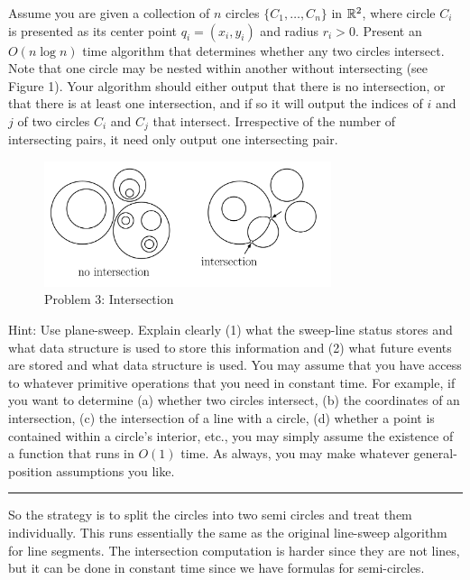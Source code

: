 \documentclass[11pt]{article}
\begin{document}

Assume you are given a collection of $n$ circles $\{C_1 , \ldots , C_n \}$ in
$\mathbb{R}^2$, where circle $C_i$ is presented as its center point $q_i = (x_i, y_i)$
and radius $r_i > 0$. Present an $O(n \log n)$ time algorithm that determines
whether any two circles intersect. Note that one circle may be nested within
another without intersecting (see Figure 1). Your algorithm should either output
that there is no intersection, or that there is at least one intersection, and
if so it will output the indices of $i$ and $j$ of two circles $C_i$ and $C_j$
that intersect. Irrespective of the number of intersecting pairs, it need only
output one intersecting pair.

\begin{figure}[h]
    \centering
    \includegraphics[width=0.75\textwidth]{intersection}
    \caption{Problem 3: Intersection}
\end{figure}

Hint: Use plane-sweep. Explain clearly (1) what the sweep-line status stores and
what data structure is used to store this information and (2) what future events
are stored and what data structure is used. You may assume that you have access
to whatever primitive operations that you need in constant time. For example, if
you want to determine (a) whether two circles intersect, (b) the coordinates of
an intersection, (c) the intersection of a line with a circle, (d) whether a
point is contained within a circle's interior, etc., you may simply assume the
existence of a function that runs in $O(1)$ time. As always, you may make
whatever general-position assumptions you like.

\hrule


So the strategy is to split the circles into two semi circles and treat them individually.
This runs essentially the same as the original line-sweep algorithm for line segments.
The intersection computation is harder since they are not lines, but it can be done in constant time since we have formulas for semi-circles.
\end{document}
